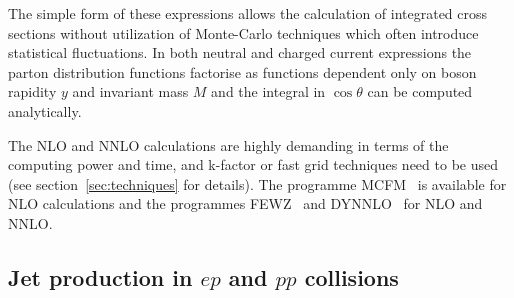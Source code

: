 The simple form of these expressions allows the calculation of integrated
cross sections without utilization of Monte-Carlo techniques which often 
introduce statistical fluctuations.
In both neutral and charged current expressions the parton distribution functions
factorise as functions dependent only on boson rapidity \(y\) and
invariant mass \(M\) and
the integral in \(\cos\theta\) can be computed analytically.

The NLO and NNLO calculations are 
highly demanding
in terms of the computing power and time, and k-factor or fast grid techniques 
need to be used (see section~\ref{sec:techniques}
for details).
The programme MCFM~\cite{Campbell:1999ah,Campbell:2000je,Campbell:2010ff} 
is available for NLO calculations and the programmes
FEWZ~\cite{FEWZ} and DYNNLO~\cite{DYNNLO} for NLO and NNLO.
 






\subsection{Jet production in $ep$ and $pp$ collisions}
\label{jetsection}

